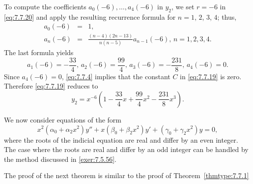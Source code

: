 \documentclass{ximera}
\begin{document}
\begin{example}
\begin{explanation}
To compute the coefficients
$a_0(-6),\dots,a_4(-6)$ in $y_2$, we
set $r=-6$ in \eqref{eq:7.7.20} and apply the resulting recurrence
formula for $n=1$, $2$, $3$, $4$;   thus,
\begin{eqnarray*}
a_0(-6)&=&1,\\
a_n(-6)&=&\frac{(n-4)(2n-13)}{n(n-5)}a_{n-1}(-6),\,n=1,2,3,4.
\end{eqnarray*}
The last formula yields
$$
a_1(-6)=-\frac{33}{4},\,a_2(-6)=\frac{99}{4},\,a_3(-6)=-\frac{231}{8},\,a_4(-6)=0.
$$
Since $a_4(-6)=0$, \eqref{eq:7.7.4} implies that the constant $C$
in \eqref{eq:7.7.19} is zero. Therefore \eqref{eq:7.7.19} reduces
to
$$
y_2=x^{-6}\left(1-\frac{33}{4}x+\frac{99}{4}x^2-\frac{231}{8}x^3\right).
$$
\end{explanation}
\end{example}

We now consider   equations  of the form
$$
x^2(\alpha_0+\alpha_2x^2)y''+x(\beta_0+\beta_2x^2)y'
+(\gamma_0+\gamma_2x^2)y=0,
$$
where the roots of the indicial equation are real and differ by an
even integer. The case where the roots are real and differ by an odd
integer can be handled by the method discussed in
\ref{exer:7.5.56}.

The  proof of the next theorem is similar to the proof of
Theorem~\ref{thmtype:7.7.1} %
\end{document}

